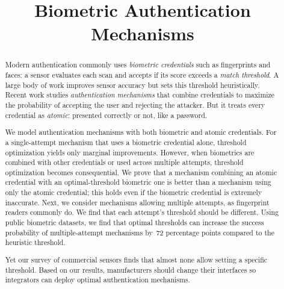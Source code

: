 \documentclass[conference,compsoc]{IEEEtran}
\begin{document}
\sloppy

\title{Biometric Authentication Mechanisms}
\maketitle

\begin{abstract}
Modern authentication commonly uses \emph{biometric credentials} such as fingerprints and faces: 
a sensor evaluates each scan and accepts if its score exceeds a \emph{match threshold}. 
A large body of work improves sensor accuracy but sets this threshold heuristically. 
Recent work studies \emph{authentication mechanisms} that combine credentials to maximize the probability of accepting the user and rejecting the attacker. 
But it treats every credential as \emph{atomic}: presented correctly or not, like a password. 

We model authentication mechanisms with both biometric and atomic credentials. 
For a single-attempt mechanism that uses a biometric credential alone, threshold optimization yields only marginal improvements. 
However, when biometrics are combined with other credentials or used across multiple attempts, threshold optimization becomes consequential.
We prove that a mechanism combining an atomic credential with an optimal-threshold biometric one is better than a mechanism using only the atomic credential; this holds even if the biometric credential is extremely inaccurate. 
Next, we consider mechanisms allowing multiple attempts, as fingerprint readers commonly do. 
We find that each attempt's threshold should be different. 
Using public biometric datasets, we find that optimal thresholds can increase the success probability of multiple-attempt mechanisms by~72 percentage points compared to the heuristic threshold. 

Yet our survey of commercial sensors finds that almost none allow setting a specific threshold. 
Based on our results, manufacturers should change their interfaces so integrators can deploy optimal authentication mechanisms.
\end{abstract}
\end{document}
